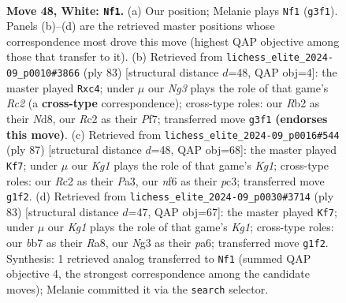 \documentclass[11pt]{article}
\begin{document}
\clearpage

\begin{figure}[p]\centering
\begin{subfigure}{0.46\textwidth}\centering
\resizebox{\linewidth}{!}{%
\newchessgame
\chessboard[
  setfen={6k1/1b3p2/5np1/8/7P/6N1/1RR4P/3q2K1 w - - 3 48},
  showmover=false,
  pgfstyle=straightmove, color=movearrow, markmove={g3-f1}
]}
\caption{}
\end{subfigure}\hfill
\begin{subfigure}{0.46\textwidth}\centering
\resizebox{\linewidth}{!}{%
\newchessgame
\chessboard[
  setfen={3n1Q2/p1rk1p2/1p3P2/1P6/2P5/5K2/8/8 b - - 0 42},
  showmover=false,
  pgfstyle=straightmove, color=movearrow, markmove={c7-c4}
]}
\caption{}
\end{subfigure}
\\[4pt]
\begin{subfigure}{0.46\textwidth}\centering
\resizebox{\linewidth}{!}{%
\newchessgame
\chessboard[
  setfen={r1r3k1/7p/4p3/4B1Q1/6p1/p1P5/b5P1/6K1 b - - 1 44},
  showmover=false,
  pgfstyle=straightmove, color=movearrow, markmove={g8-f7}
]}
\caption{}
\end{subfigure}\hfill
\begin{subfigure}{0.46\textwidth}\centering
\resizebox{\linewidth}{!}{%
\newchessgame
\chessboard[
  setfen={r3r1k1/7p/P2p4/6Q1/4P3/8/6PK/8 b - - 4 42},
  showmover=false,
  pgfstyle=straightmove, color=movearrow, markmove={g8-f7}
]}
\caption{}
\end{subfigure}
\caption{\textbf{Move 48, White: \texttt{Nf1}.} (a) Our position; Melanie plays \texttt{Nf1} (\texttt{g3f1}). Panels (b)--(d) are the retrieved master positions whose correspondence most drove this move (highest QAP objective among those that transfer to it). (b) Retrieved from \texttt{lichess\_elite\_2024-09\_p0010\#3866} (ply 83) [structural distance $d$=48, QAP obj=4]: the master played \texttt{Rxc4}; under $\mu$ our \emph{Ng3} plays the role of that game's \emph{Rc2} (a \textbf{cross-type} correspondence); cross-type roles: our \emph{R}b2 as their \emph{N}d8, our \emph{R}c2 as their \emph{P}f7; transferred move \texttt{g3f1} \textbf{(endorses this move)}. (c) Retrieved from \texttt{lichess\_elite\_2024-09\_p0016\#544} (ply 87) [structural distance $d$=48, QAP obj=68]: the master played \texttt{Kf7}; under $\mu$ our \emph{Kg1} plays the role of that game's \emph{Kg1}; cross-type roles: our \emph{R}c2 as their \emph{P}a3, our \emph{n}f6 as their \emph{p}c3; transferred move \texttt{g1f2}. (d) Retrieved from \texttt{lichess\_elite\_2024-09\_p0030\#3714} (ply 83) [structural distance $d$=47, QAP obj=67]: the master played \texttt{Kf7}; under $\mu$ our \emph{Kg1} plays the role of that game's \emph{Kg1}; cross-type roles: our \emph{b}b7 as their \emph{R}a8, our \emph{N}g3 as their \emph{p}a6; transferred move \texttt{g1f2}. Synthesis: 1 retrieved analog transferred to \texttt{Nf1} (summed QAP objective 4, the strongest correspondence among the candidate moves); Melanie committed it via the \texttt{search} selector.}
\label{fig:thought-m94}
\end{figure}
\end{document}
